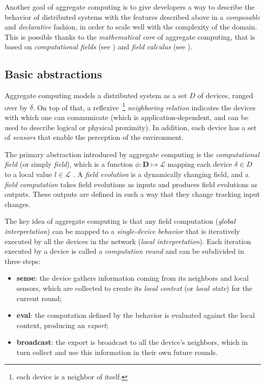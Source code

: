 Another goal of aggregate computing is to give developers a way to describe the behavior of distributed systems with the features described above in a \textit{composable} and \textit{declarative} fashion, in order to scale well with the complexity of the domain.
%
This is possible thanks to the \textit{mathematical core} of aggregate computing, that is based on \textit{computational fields} (see ) and \textit{field calculus} (see ).

\subsection{Basic abstractions}
\label{sec:ac-abstractions}

Aggregate computing models a distributed system as a set $D$ of devices, ranged over by $\delta$.
%
On top of that, a reflexive~\footnote{each device is a neighbor of itself.} \textit{neighboring relation} indicates the devices with which one can communicate (which is application-dependent, and can be used to describe logical or physical proximity).
%
In addition, each device has a set of \textit{sensors} that enable the perception of the environment.

The primary abstraction introduced by aggregate computing is the \textit{computational field} (or simply \textit{field}), which is a function $\phi : \mathbf{D} \mapsto \mathcal{L}$ mapping each device $\delta \in D$ to a local value $l \in \mathcal{L}$ \cite{10.1145/3177774}.
%
A \textit{field evolution} is a dynamically changing field, and a \textit{field computation} takes field evolutions as inputs and produces field evolutions as outputs.
%
These outputs are defined in such a way that they change tracking input changes.

The key idea of aggregate computing is that any field computation (\textit{global interpretation}) can be mapped to a \textit{single-device behavior} that is iteratively executed by all the devices in the network (\textit{local interpretation}).
%
Each iteration executed by a device is called a \textit{computation round} and can be subdivided in three steps:
%
\begin{itemize}
    \item \textbf{sense}: the device gathers information coming from its neighbors and local sensors, which are collected to create its \textit{local context} (or \textit{local state}) for the current round;
    \item \textbf{eval}: the computation defined by the behavior is evaluated against the local context, producing an \textit{export};
    \item \textbf{broadcast}: the export is broadcast to all the device's neighbors, which in turn collect and use this information in their own future rounds.
\end{itemize}

